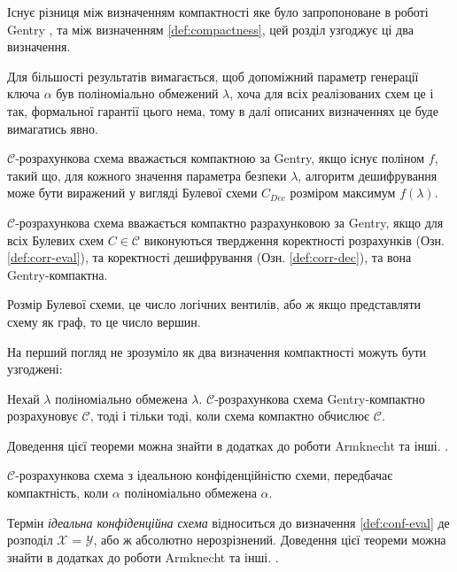 Існує різниця між визначенням компактності яке було запропоноване в роботі Gentry 
\cite{homenc}, та між визначенням \ref{def:compactness}, цей розділ узгоджує ці два
визначення.

Для більшості результатів вимагається, щоб допоміжний параметр генерації ключа \(\alpha\)
був поліноміально обмежений \(\lambda\), хоча для всіх реалізованих схем це і так, 
формальної гарантії цього нема, тому в далі описаних визначеннях це буде вимагатись явно.

\begin{definition}
    \(\mathcal{C}\)-розрахункова схема вважається компактною за Gentry, якщо існує
    поліном \(f\), такий що, для кожного значення параметра безпеки \(\lambda\), алгоритм
    дешифрування може бути виражений у вигляді Булевої схеми \(C_{Dec}\) розміром максимум
    \(f(\lambda)\).
\end{definition}

\begin{definition}
\(\mathcal{C}\)-розрахункова схема вважається компактно разрахунковою за Gentry, якщо
для всіх Булевих схем \(C \in \mathcal{C}\) виконуються твердження коректності розрахунків
(Озн. \ref{def:corr-eval}), та коректності дешифрування (Озн. \ref{def:corr-dec}), та вона 
Gentry-компактна.
\end{definition}

Розмір Булевої схеми, це число логічних вентилів, або ж якщо представляти схему як граф, то
це число вершин.

На перший погляд не зрозуміло як два визначення компактності можуть бути узгоджені:
\begin{theorem}
    Нехай \(\lambda\) поліноміально обмежена \(\lambda\). \(\mathcal{C}\)-розрахункова
    схема Gentry-компактно розрахуновує \(\mathcal{C}\), тоді і тільки тоді, коли схема
    компактно обчислює \(\mathcal{C}\).
\end{theorem}
Доведення цієї теореми можна знайти в додатках до роботи Armknecht та інші. \cite{cryptoeprint:2015/1192}.

\begin{theorem}
    \label{theorem:ideal-conf-compactness}
    \(\mathcal{C}\)-розрахункова схема з ідеальною конфіденційністю схеми, передбачає
    компактність, коли \(\alpha\) поліноміально обмежена \(\alpha\).
\end{theorem}
Термін \emph{ідеальна конфіденційна схема} відноситься до визначення \ref{def:conf-eval} де
розподіл \(\mathcal{X}\) = \(\mathcal{Y}\), або ж абсолютно нерозрізнений.
Доведення цієї теореми можна знайти в додатках до роботи Armknecht та інші. \cite{cryptoeprint:2015/1192}.

